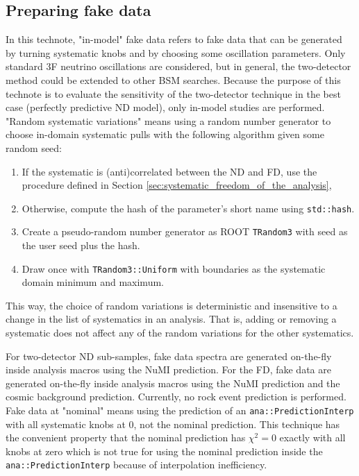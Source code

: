 \documentclass{article}
\begin{document}
\subsection{Preparing fake data}
In this technote, "in-model" fake data refers to fake data that can be generated by turning systematic knobs and by choosing some oscillation parameters. Only standard 3F neutrino oscillations are considered, but in general, the two-detector method could be extended to other BSM searches. Because the purpose of this technote is to evaluate the sensitivity of the two-detector technique in the best case (perfectly predictive ND model), only in-model studies are performed. "Random systematic variations" means using a random number generator to choose in-domain systematic pulls with the following algorithm given some random seed:
\begin{enumerate}
  \item If the systematic is (anti)correlated between the ND and FD, use the procedure defined in Section \ref{sec:systematic_freedom_of_the_analysis},
  \item Otherwise, compute the hash of the parameter's short name using \texttt{std::\-hash}.
  \item Create a pseudo-random number generator as ROOT \texttt{TRandom3} with seed as the user seed plus the hash.
  \item Draw once with \texttt{TRandom3::\-Uniform} with boundaries as the systematic domain minimum and maximum.
\end{enumerate}
This way, the choice of random variations is deterministic and insensitive to a change in the list of systematics in an analysis. That is, adding or removing a systematic does not affect any of the random variations for the other systematics.

For two-detector ND sub-samples, fake data spectra are generated on-the-fly inside analysis macros using the NuMI prediction. For the FD, fake data are generated on-the-fly inside analysis macros using the NuMI prediction and the cosmic background prediction. Currently, no rock event prediction is performed. Fake data at "nominal" means using the prediction of an \texttt{ana::\-Prediction\-Interp} with all systematic knobs at 0, not the nominal prediction. This technique has the convenient property that the nominal prediction has $\chi^2 = 0$ exactly with all knobs at zero which is not true for using the nominal prediction inside the \texttt{ana::\-Prediction\-Interp} because of interpolation inefficiency.
\end{document}
